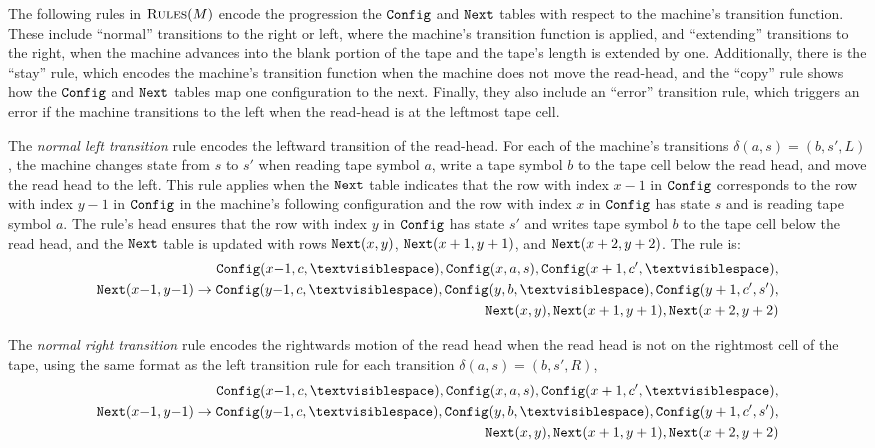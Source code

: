 The following rules in $\textsc{Rules}(M)$
encode the progression
the $\texttt{Config}$ and $\texttt{Next}$ tables
with respect to the machine's transition function.
These include ``normal'' transitions to the right or left,
where the machine's transition function is applied,
and ``extending'' transitions to the right,
when the machine advances into the blank portion of the tape
and the tape's length is extended by one.
Additionally, there is the ``stay'' rule,
which encodes the machine's transition function
when the machine does not move the read-head,
and the ``copy'' rule
shows how the $\texttt{Config}$ and $\texttt{Next}$ tables
map one configuration to the next.
Finally, they also include an ``error'' transition rule,
which triggers an error
if the machine transitions to the left
when the read-head is at the leftmost tape cell.

The {\it normal left transition} rule
encodes the leftward transition of the read-head.
For each of the machine's transitions
$\delta(a,s)=(b,s',L)$,
the machine changes state from $s$ to $s'$
when reading tape symbol $a$,
write a tape symbol $b$ to the tape cell below the read head,
and move the read head to the left.
This rule applies when the $\texttt{Next}$ table
indicates that the row with index $x{-}1$ in $\texttt{Config}$
corresponds to the row with index $y{-}1$ in $\texttt{Config}$
in the machine's following configuration
and the row with index $x$ in $\texttt{Config}$
has state $s$ and is reading tape symbol $a$.
The rule's head ensures that the row with index $y$ in $\texttt{Config}$
has state $s'$ and writes tape symbol $b$
to the tape cell below the read head,
and the $\texttt{Next}$ table is updated
with rows $\texttt{Next}(x,y)$, $\texttt{Next}(x+1,y+1)$, and $\texttt{Next}(x+2,y+2)$.
The rule is:
\begin{align}
    \begin{split}
\Config(x{-}1,c,\blank), \Config(x,a,s), \Config(x+1,c',\blank),\\
\Next(x{-}1,y{-}1) \rightarrow \Config(y{-}1,c,\blank), \Config(y,b,\blank), \Config(y+1,c',s'),\\
\Next(x,y), \Next(x+1,y+1), \Next(x+2,y+2)
    \end{split}
\end{align}

The {\it normal right transition} rule
encodes the rightwards motion
of the read head when the read head is not on the rightmost cell of the tape,
using the same format as the left transition rule
for each transition $\delta(a,s)=(b,s',R)$,
\begin{align}
    \begin{split}
\Config(x{-}1,c,\blank), \Config(x,a,s), \Config(x+1,c',\blank),\\
\Next(x{-}1,y{-}1) \rightarrow \Config(y{-}1,c,\blank), \Config(y,b,\blank), \Config(y+1,c',s'),\\
\Next(x,y), \Next(x+1,y+1), \Next(x+2,y+2)
    \end{split}
\end{align}

